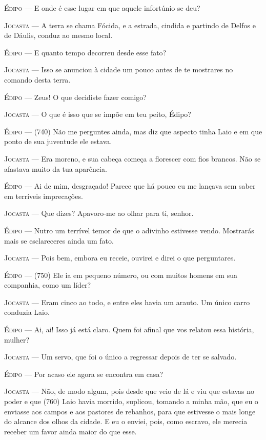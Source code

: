 \textsc{Édipo} --- E onde é esse lugar em que aquele infortúnio se deu?

\textsc{Jocasta} --- A terra se chama Fócida, e a estrada, cindida e partindo de Delfos e de
Dáulis, conduz ao mesmo local.

\textsc{Édipo} --- E quanto tempo decorreu desde esse fato?

\textsc{Jocasta} --- Isso se anunciou à cidade um pouco antes de te mostrares no comando
desta terra.

\textsc{Édipo} --- Zeus! O que decidiste fazer comigo?

\textsc{Jocasta} --- O que é isso que se impõe em teu peito, Édipo?

\textsc{Édipo} --- (740) Não me perguntes ainda, mas diz que aspecto tinha Laio e em que
ponto de sua juventude ele estava.

\textsc{Jocasta} --- Era moreno, e sua cabeça começa a florescer com fios brancos. Não se
afastava muito da tua aparência.

\textsc{Édipo} --- Ai de mim, desgraçado! Parece que há pouco eu me lançava sem saber em
terríveis imprecações.

\textsc{Jocasta} --- Que dizes? Apavoro-me ao olhar para ti, senhor.

\textsc{Édipo} --- Nutro um terrível temor de que o adivinho estivesse vendo. Mostrarás
mais se esclareceres ainda um fato.

\textsc{Jocasta} --- Pois bem, embora eu receie, ouvirei e direi o que perguntares.

\textsc{Édipo} --- (750) Ele ia em pequeno número, ou com muitos homens em sua companhia,
como um líder?

\textsc{Jocasta} --- Eram cinco ao todo, e entre eles havia um arauto. Um único carro
conduzia Laio.

\textsc{Édipo} --- Ai, ai! Isso já está claro. Quem foi afinal que vos relatou essa
história, mulher?

\textsc{Jocasta} --- Um servo, que foi o único a regressar depois de ter se salvado.

\textsc{Édipo} --- Por acaso ele agora se encontra em casa?

\textsc{Jocasta} --- Não, de modo algum, pois desde que veio de lá e viu que estavas no poder
e que (760) Laio havia morrido, suplicou, tomando a minha mão, que eu o
enviasse aos campos e aos pastores de rebanhos, para que estivesse o
mais longe do alcance dos olhos da cidade. E eu o enviei, pois, como
escravo, ele merecia receber um favor ainda maior do que esse.

